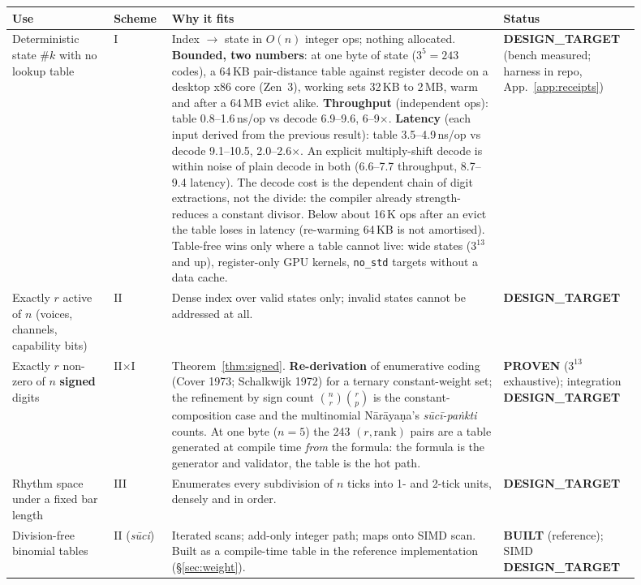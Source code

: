 \documentclass[11pt,letterpaper]{article}
\newcommand{\tagbox}[2]{\textsf{\textbf{\color{#1}#2}}}
\newcommand{\PROVEN}{\tagbox{tagproven}{PROVEN}}
\newcommand{\BUILT}{\tagbox{tagbuilt}{BUILT}}
\newcommand{\DESIGN}{\tagbox{tagdesign}{DESIGN\_TARGET}}
\newcommand{\skt}[1]{\textit{#1}}
\newcommand{\code}[1]{\texttt{#1}}
\theoremstyle{plain}
\theoremstyle{remark}
\begin{document}
{\small
\begin{longtable}{@{}>{\raggedright\arraybackslash}p{0.15\linewidth}>{\raggedright\arraybackslash}p{0.08\linewidth}p{0.49\linewidth}>{\raggedright\arraybackslash}p{0.18\linewidth}@{}}
\toprule
\textbf{Use} & \textbf{Scheme} & \textbf{Why it fits} & \textbf{Status}\\
\midrule\endhead
\bottomrule\endfoot
Deterministic state $\#k$ with no lookup table & I & Index $\to$ state in $O(n)$ integer ops; nothing allocated. \textbf{Bounded, two numbers}: at one byte of state ($3^5 = 243$ codes), a 64\,KB pair-distance table against register decode on a desktop x86 core (Zen~3), working sets 32\,KB to 2\,MB, warm and after a 64\,MB evict alike. \textbf{Throughput} (independent ops): table 0.8--1.6\,ns/op vs decode 6.9--9.6, 6--9$\times$. \textbf{Latency} (each input derived from the previous result): table 3.5--4.9\,ns/op vs decode 9.1--10.5, 2.0--2.6$\times$. An explicit multiply-shift decode is within noise of plain decode in both (6.6--7.7 throughput, 8.7--9.4 latency). The decode cost is the dependent chain of digit extractions, not the divide: the compiler already strength-reduces a constant divisor. Below about 16\,K ops after an evict the table loses in latency (re-warming 64\,KB is not amortised). Table-free wins only where a table cannot live: wide states ($3^{13}$ and up), register-only GPU kernels, \code{no\_std} targets without a data cache. & \DESIGN{} (bench measured; harness in repo, App.~\ref{app:receipts})\\
Exactly $r$ active of $n$ (voices, channels, capability bits) & II & Dense index over valid states only; invalid states cannot be addressed at all. & \DESIGN\\
Exactly $r$ non-zero of $n$ \textbf{signed} digits & II$\times$I & Theorem~\ref{thm:signed}. \textbf{Re-derivation} of enumerative coding (Cover 1973; Schalkwijk 1972) for a ternary constant-weight set; the refinement by sign count $\binom{n}{r}\binom{r}{p}$ is the constant-composition case and the multinomial Nārāyaṇa's \skt{sūcī-paṅkti} counts. At one byte ($n=5$) the 243 $(r,\mathrm{rank})$ pairs are a table generated at compile time \emph{from} the formula: the formula is the generator and validator, the table is the hot path. & \PROVEN{} ($3^{13}$ exhaustive); integration \DESIGN\\
Rhythm space under a fixed bar length & III & Enumerates every subdivision of $n$ ticks into 1- and 2-tick units, densely and in order. & \DESIGN\\
Division-free binomial tables & II (\skt{sūci}) & Iterated scans; add-only integer path; maps onto SIMD scan. Built as a compile-time table in the reference implementation (§\ref{sec:weight}). & \BUILT{} (reference); SIMD \DESIGN\\

\end{longtable}}
\end{document}
